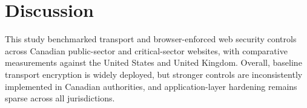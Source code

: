 \documentclass[conference]{IEEEtran}
\begin{document}

  

\section{Discussion}\label{sec:discussion}
This study benchmarked transport and browser-enforced web security controls across Canadian public-sector and critical-sector websites, with comparative measurements against the United States and United Kingdom. Overall, baseline transport encryption is widely deployed, but stronger controls are inconsistently implemented in Canadian authorities, and application-layer hardening remains sparse across all jurisdictions.
\end{document}

